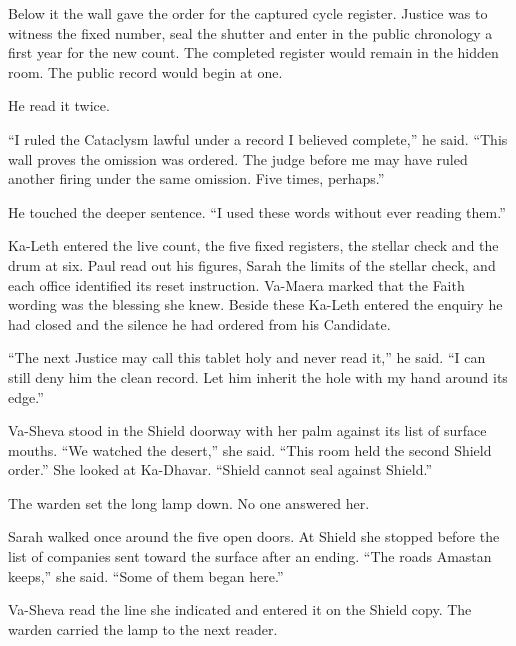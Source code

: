 Below it the wall gave the order for the captured cycle register. Justice was to witness the fixed number, seal the shutter and enter in the public chronology a first year for the new count. The completed register would remain in the hidden room. The public record would begin at one.\par

He read it twice.\par

``I ruled the Cataclysm lawful under a record I believed complete,'' he said. ``This wall proves the omission was ordered. The judge before me may have ruled another firing under the same omission. Five times, perhaps.''\par

He touched the deeper sentence. ``I used these words without ever reading them.''\par

Ka-Leth entered the live count, the five fixed registers, the stellar check and the drum at six. Paul read out his figures, Sarah the limits of the stellar check, and each office identified its reset instruction. Va-Maera marked that the Faith wording was the blessing she knew. Beside these Ka-Leth entered the enquiry he had closed and the silence he had ordered from his Candidate.\par

``The next Justice may call this tablet holy and never read it,'' he said. ``I can still deny him the clean record. Let him inherit the hole with my hand around its edge.''\par

Va-Sheva stood in the Shield doorway with her palm against its list of surface mouths. ``We watched the desert,'' she said. ``This room held the second Shield order.'' She looked at Ka-Dhavar. ``Shield cannot seal against Shield.''\par

The warden set the long lamp down. No one answered her.\par

Sarah walked once around the five open doors. At Shield she stopped before the list of companies sent toward the surface after an ending. ``The roads Amastan keeps,'' she said. ``Some of them began here.''\par

Va-Sheva read the line she indicated and entered it on the Shield copy. The warden carried the lamp to the next reader.\par

